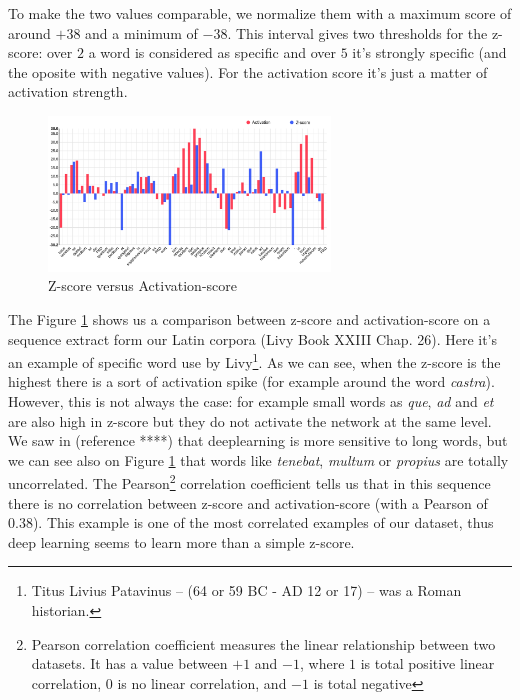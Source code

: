 To make the two values comparable, we normalize them with a maximum score of around $+38$ and a minimum of $-38$. This interval gives two thresholds for the z-score: over $2$ a word is considered as specific and over $5$ it's strongly specific (and the oposite with negative values). For the activation score it's just a matter of activation strength.

\begin{figure}[h]
\begin{center}
\includegraphics[width=7.5cm]{img/z-score_activations.png}
\caption{Z-score versus Activation-score}
\label{comparision}
\end{center}
\end{figure}

The Figure \ref{comparision} shows us a comparison between z-score and activation-score on a sequence extract form our Latin corpora (Livy Book XXIII Chap. 26). 
Here it's an example of specific word use by Livy\footnote{Titus Livius Patavinus -- (64 or 59 BC - AD 12 or 17) -- was a Roman historian.}. As we can see, when the z-score is the highest there is a sort of activation spike (for example around the word \textit{castra}). However, this is not always the case: for example small words as \textit{que}, \textit{ad} and \textit{et} are also high in z-score but they do not activate the network at the same level. We saw in (reference ****) that deeplearning is more sensitive to long words, but we can see also on Figure \ref{comparision} that words like \textit{tenebat}, \textit{multum} or \textit{propius} are totally uncorrelated. The Pearson\footnote{Pearson correlation coefficient measures the linear relationship between two datasets. It has a value between $+1$ and $-1$, where $1$ is total positive linear correlation, $0$ is no linear correlation, and $-1$ is total negative} correlation coefficient tells us that in this sequence there is no correlation between z-score and activation-score (with a Pearson of 0.38). This example is one of the most correlated examples of our dataset, thus deep learning seems to learn more than a simple z-score.

